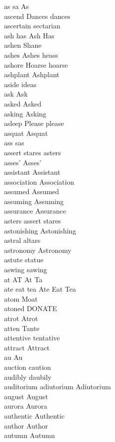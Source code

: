 as sa As\\
ascend Dances dances\\
ascertain sectarian\\
ash has Ash Has\\
ashen Shane\\
ashes Ashes heass\\
ashore Hoarse hoarse\\
ashplant Ashplant\\
aside ideas\\
ask Ask\\
asked Asked\\
asking Asking\\
asleep Please please\\
asquat Asquat\\
ass sas\\
assert stares asters\\
asses' Asses'\\
assistant Assistant\\
association Association\\
assumed Assumed\\
assuming Assuming\\
assurance Assurance\\
asters assert stares\\
astonishing Astonishing\\
astral altars\\
astronomy Astronomy\\
astute statue\\
aswing sawing\\
at AT At Ta\\
ate eat tea Ate Eat Tea\\
atom Moat\\
atoned DONATE\\
atrot Atrot\\
atten Tante\\
attentive tentative\\
attract Attract\\
au Au\\
auction caution\\
audibly daubily\\
auditorium adiutorium Adiutorium\\
august August\\
aurora Aurora\\
authentic Authentic\\
author Author\\
autumn Autumn\\
